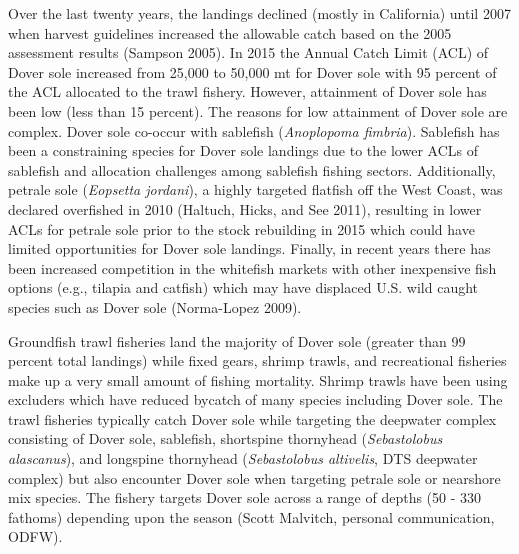 \documentclass[11pt,
  english,
  a4paper,
]{article}
\begin{document}
\leavevmode\tagmcend\tagstructend\par


Over the last twenty years, the landings declined (mostly in California) until 2007 when harvest guidelines increased the allowable catch based on the 2005 assessment results {(Sampson 2005)\leavevmode\tagmcend\tagstructend}. In 2015 the Annual Catch Limit (ACL) of Dover sole increased from 25,000 to 50,000 mt for Dover sole with 95 percent of the ACL allocated to the trawl fishery. However, attainment of Dover sole has been low (less than 15 percent). The reasons for low attainment of Dover sole are complex. Dover sole co-occur with sablefish (\emph{Anoplopoma fimbria}). Sablefish has been a constraining species for Dover sole landings due to the lower ACLs of sablefish and allocation challenges among sablefish fishing sectors. Additionally, petrale sole (\emph{Eopsetta jordani}), a highly targeted flatfish off the West Coast, was declared overfished in 2010 {(Haltuch, Hicks, and See 2011)\leavevmode\tagmcend\tagstructend}, resulting in lower ACLs for petrale sole prior to the stock rebuilding in 2015 which could have limited opportunities for Dover sole landings. Finally, in recent years there has been increased competition in the whitefish markets with other inexpensive fish options (e.g., tilapia and catfish) which may have displaced U.S. wild caught species such as Dover sole {(Norma-Lopez 2009)\leavevmode\tagmcend\tagstructend}.

\leavevmode\tagmcend\tagstructend\par


Groundfish trawl fisheries land the majority of Dover sole (greater than 99 percent total landings) while fixed gears, shrimp trawls, and recreational fisheries make up a very small amount of fishing mortality. Shrimp trawls have been using excluders which have reduced bycatch of many species including Dover sole. The trawl fisheries typically catch Dover sole while targeting the deepwater complex consisting of Dover sole, sablefish, shortspine thornyhead (\emph{Sebastolobus alascanus}), and longspine thornyhead (\emph{Sebastolobus altivelis}, DTS deepwater complex) but also encounter Dover sole when targeting petrale sole or nearshore mix species. The fishery targets Dover sole across a range of depths (50 - 330 fathoms) depending upon the season (Scott Malvitch, personal communication, ODFW).
\end{document}
